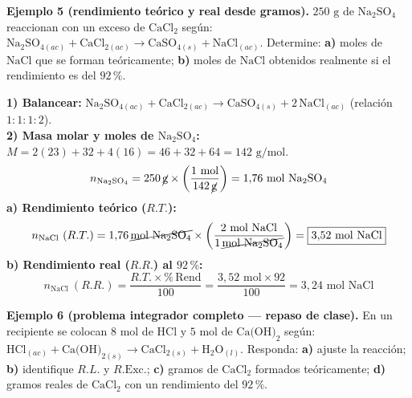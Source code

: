 \documentclass[12pt, letterpaper]{article}
\newcommand{\pc}{\text{\%}}
\begin{document}
\newpage
\noindent\textbf{Ejemplo 5 (rendimiento teórico y real desde gramos).} $250\text{ g}$ de $\text{Na}_2\text{SO}_4$ reaccionan con un exceso de $\text{CaCl}_2$ según: $\text{Na}_2\text{SO}_{4(ac)} + \text{CaCl}_{2(ac)} \longrightarrow \text{CaSO}_{4(s)} + \text{NaCl}_{(ac)}$. Determine: \textbf{a)} moles de $\text{NaCl}$ que se forman teóricamente; \textbf{b)} moles de $\text{NaCl}$ obtenidos realmente si el rendimiento es del $92\,\pc$.

\begin{cuadrosolucion}[nobreak=true]
  \small
  \textbf{1) Balancear:} $\text{Na}_2\text{SO}_{4(ac)} + \text{CaCl}_{2(ac)} \longrightarrow \text{CaSO}_{4(s)} + 2\,\text{NaCl}_{(ac)}$ (relación $1:1:1:2$).\\[3pt]
  \textbf{2) Masa molar y moles de $\text{Na}_2\text{SO}_4$:} $M = 2(23) + 32 + 4(16) = 46 + 32 + 64 = 142\text{ g/mol}$.
  \[
    n_{\text{Na}_2\text{SO}_4} = 250\,\cancel{\text{g}} \times \left(\frac{1\text{ mol}}{142\,\cancel{\text{g}}}\right) = 1{,}76\text{ mol Na}_2\text{SO}_4
  \]
  \textbf{a) Rendimiento teórico ($R.T.$):}
  \[
    n_{\text{NaCl}}\ (R.T.) = 1{,}76\,\cancel{\text{mol Na}_2\text{SO}_4} \times \left(\frac{2\text{ mol NaCl}}{1\,\cancel{\text{mol Na}_2\text{SO}_4}}\right) = \boxed{3{,}52\text{ mol NaCl}}
  \]
  \textbf{b) Rendimiento real ($R.R.$) al $92\,\pc$:}
  \[
    n_{\text{NaCl}}\ (R.R.) = \frac{R.T.\times \pc\,\text{Rend}}{100} = \frac{3{,}52\text{ mol}\times 92}{100} = \boxed{3{,}24\text{ mol NaCl}}
  \]
\end{cuadrosolucion}

\newpage
\noindent\textbf{Ejemplo 6 (problema integrador completo — repaso de clase).} En un recipiente se colocan $8\text{ mol}$ de $\text{HCl}$ y $5\text{ mol}$ de $\text{Ca(OH)}_2$ según: $\text{HCl}_{(ac)} + \text{Ca(OH)}_{2(s)} \longrightarrow \text{CaCl}_{2(s)} + \text{H}_2\text{O}_{(l)}$. Responda: \textbf{a)} ajuste la reacción; \textbf{b)} identifique $R.L.$ y $R.\text{Exc.}$; \textbf{c)} gramos de $\text{CaCl}_2$ formados teóricamente; \textbf{d)} gramos reales de $\text{CaCl}_2$ con un rendimiento del $92\,\pc$.
\end{document}
